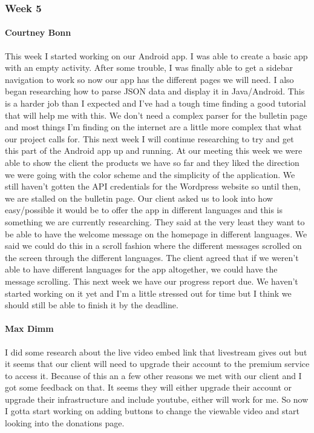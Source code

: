 		\subsubsection{Week 5}
		
			\paragraph{Courtney Bonn}
			This week I started working on our Android app. I was able to create a basic app with an empty activity. After some trouble, I was finally able to get a sidebar navigation to work so now our app has the different pages we will need. I also began researching how to parse JSON data and display it in Java/Android. This is a harder job than I expected and I've had a tough time finding a good tutorial that will help me with this. We don't need a complex parser for the bulletin page and most things I'm finding on the internet are a little more complex that what our project calls for. This next week I will continue researching to try and get this part of the Android app up and running. At our meeting this week we were able to show the client the products we have so far and they liked the direction we were going with the color scheme and the simplicity of the application. We still haven't gotten the API credentials for the Wordpress website so until then, we are stalled on the bulletin page. Our client asked us to look into how easy/possible it would be to offer the app in different languages and this is something we are currently researching. They said at the very least they want to be able to have the welcome message on the homepage in different languages. We said we could do this in a scroll fashion where the different messages scrolled on the screen through the different languages. The client agreed that if we weren't able to have different languages for the app altogether, we could have the message scrolling. This next week we have our progress report due. We haven't started working on it yet and I'm a little stressed out for time but I think we should still be able to finish it by the deadline.

			\paragraph{Max Dimm}
			I did some research about the live video embed link that livestream gives out but it seems that our client will need to upgrade their account to the premium service to access it. Because of this an a few other reasons we met with our client and I got some feedback on that. It seems they will either upgrade their account or upgrade their infrastructure and include youtube, either will work for me. So now I gotta start working on adding buttons to change the viewable video and start looking into the donations page.
			

